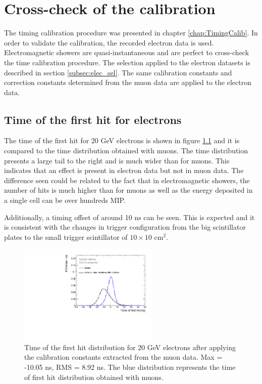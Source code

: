 \chapter{Cross-check of the calibration}
\label{chap:TimingValidation}

The timing calibration procedure was presented in chapter \ref{chap:TimingCalib}. In order to validate the calibration, the recorded electron data is used. Electromagnetic showers are quasi-instantaneous and are perfect to cross-check the time calibration procedure. The selection applied to the electron datasets is described in section \ref{subsec:elec_sel}. The same calibration constants and correction constants determined from the muon data are applied to the electron data.

\section{Time of the first hit for electrons}

The time of the first hit for 20 GeV electrons is shown in figure \ref{fig:Timing_electrons} and it is compared to the time distribution obtained with muons. The time distribution presents a large tail to the right and is much wider than for muons. This indicates that an effect is present in electron data but not in muon data. The difference seen could be related to the fact that in electromagnetic showers, the number of hits is much higher than for muons as well as the energy deposited in a single cell can be over hundreds MIP.

Additionally, a timing offset of around 10 ns can be seen. This is expected and it is consistent with the changes in trigger configuration from the big scintillator plates to the small trigger scintillator of $10\times10$ cm$^2$.

\begin{figure}[htbp!]
	\centering
	\includegraphics[width=0.6\textwidth]{../Thesis_Plots/Timing/Electrons/Plots/Timing_AllLayers_AfterMuons.pdf}
	\caption{Time of the first hit distribution for 20 GeV electrons after applying the calibration constants extracted from the muon data. Max = -10.05 ns, RMS = 8.92 ns. The blue distribution represents the time of first hit distribution obtained with muons.}
	\label{fig:Timing_electrons}
\end{figure}

